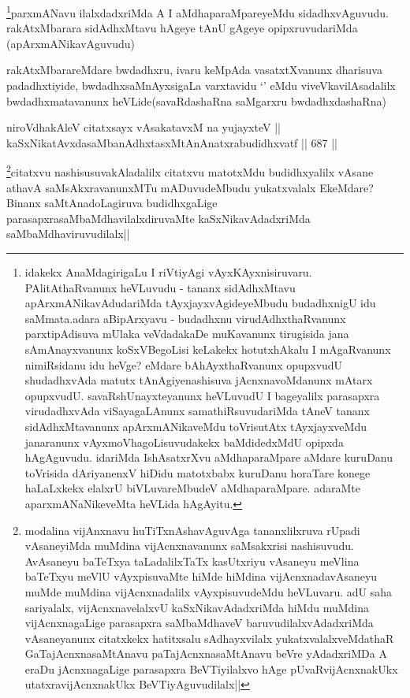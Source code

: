 \begin{artha}
\footnote{idakekx AnaMdagirigaLu I riVtiyAgi vAyxKAyxnisiruvaru. PAlitAthaRvanunx heVLuvudu - tananx sidAdhxMtavu apArxmANikavAdudariMda tAyxjayxvAgideyeMbudu budadhxnigU idu saMmata.adara aBipArxyavu - budadhxnu virudAdhxthaRvanunx parxtipAdisuva mUlaka veVdadakaDe muKavanunx tirugisida jana sAmAnayxvanunx koSxVBegoLisi keLakekx hotutxhAkalu I mAgaRvanunx nimiRsidanu idu heVge? eMdare bAhAyxthaRvanunx opupxvudU shudadhxvAda matutx tAnAgiyenashisuva jAcnxnavoMdanunx mAtarx opupxvudU. savaRshUnayxteyanunx heVLuvudU I bageyalilx parasapxra virudadhxvAda viSayagaLAnunx samathiRsuvudariMda tAneV tananx sidAdhxMtavanunx apArxmANikaveMdu toVrisutAtx tAyxjayxveMdu janaranunx vAyxmoVhagoLisuvudakekx baMdidedxMdU opipxda hAgAguvudu. idariMda IshAsatxrXvu aMdhaparaMpare aMdare kuruDanu toVrisida dAriyanenxV hiDidu matotxbabx kuruDanu horaTare konege haLaLxkekx elalxrU biVLuvareMbudeV aMdhaparaMpare. adaraMte aparxmANaNikeveMta heVLida hAgAyitu.}parxmANavu ilalxdadxriMda A I  aMdhaparaMpareyeMdu sidadhxvAguvudu. rakAtxMbarara sidAdhxMtavu hAgeye tAnU gAgeye opipxruvudariMda (apArxmANikavAguvudu)
\end{artha}

\begin{artha}
rakAtxMbarareMdare bwdadhxru, ivaru keMpAda vasatxtXvanunx dharisuva padadhxtiyide, bwdadhxsaMnAyxsigaLa varxtavidu `\stext' eMdu viveVkavilAsadalilx bwdadhxmatavanunx heVLide(savaRdashaRna saMgarxru bwdadhxdashaRna)
\end{artha}


\begin{shl}
niroVdhakAleV citatxsayx vAsakatavxM na yujayxteV ||  \\
kaSxNikatAvxdasaMbanAdhxtasxMtAnAnatxrabudidhxvatf ||  687 ||  
\end{shl}

\begin{artha}
\footnote{modalina vijAnxnavu huTiTxnAshavAguvAga tananxlilxruva rUpadi vAsaneyiMda muMdina vijAcnxnavanunx saMsakxrisi nashisuvudu. AvAsaneyu baTeTxya taLadalilxTaTx kasUtxriyu vAsaneyu meVlina baTeTxyu meVlU vAyxpisuvaMte hiMde hiMdina vijAcnxnadavAsaneyu muMde muMdina vijAcnxnadalilx vAyxpisuvudeMdu heVLuvaru. adU saha sariyalalx, vijAcnxnavelalxvU kaSxNikavAdadxriMda hiMdu muMdina vijAcnxnagaLige parasapxra saMbaMdhaveV baruvudilalxvAdadxriMda vAsaneyanunx citatxkekx hatitxsalu sAdhayxvilalx yukatxvalalxveMdathaR GaTajAcnxnasaMtAnavu paTajAcnxnasaMtAnavu beVre yAdadxriMDa A eraDu jAcnxnagaLige parasapxra BeVTiyilalxvo hAge pUvaRvijAcnxnakUkx utatxravijAcnxnakUkx BeVTiyAguvudilalx||}citatxvu nashisusuvakAladalilx citatxvu matotxMdu budidhxyalilx vAsane athavA saMsAkxravanunxMTu mADuvudeMbudu yukatxvalalx EkeMdare? Binanx saMtAnadoLagiruva budidhxgaLige parasapxrasaMbaMdhavilalxdiruvaMte kaSxNikavAdadxriMda saMbaMdhaviruvudilalx||
\end{artha}

